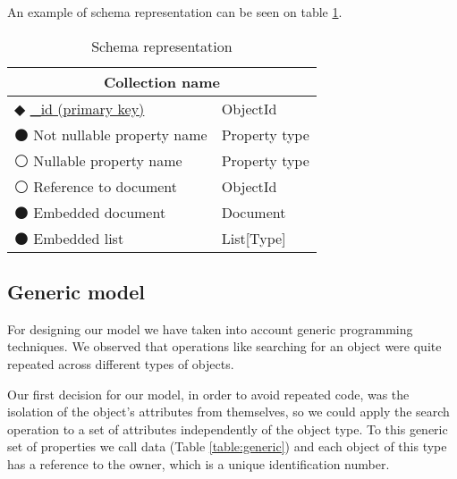     An example of schema representation can be seen on table \ref{table:schema}.

\begin{table}[!htb]
\centering
\caption{Schema representation}
\label{table:schema}
    \begin{tabular}{|ll|}
        \hline
        \multicolumn{2}{|c|}{\textbf{Collection name}}              \\ \hline
        $\Diamondblack$ \underline{\_id (primary key)}  & ObjectId  \\ 
        $\medbullet$ Not nullable property name  & Property type    \\ 
        $\medcirc$ Nullable property name      & Property type      \\
        $\medcirc$ Reference to document     & ObjectId             \\
        $\medbullet$ Embedded document      & Document              \\ 
        $\medbullet$ Embedded list      & List[Type]                \\ \hline
    \end{tabular}
\end{table}

\subsection {Generic model}

For designing our model we have taken into account generic programming techniques. We observed that operations like searching for an object were quite repeated across different types of objects. 

Our first decision for our model, in order to avoid repeated code, was the isolation of the object's attributes from themselves, so we could apply the search operation to a set of attributes independently of the object type. To this generic set of properties we call data (Table \ref{table:generic}) and each object of this type has a reference to the owner, which is a unique identification number.

